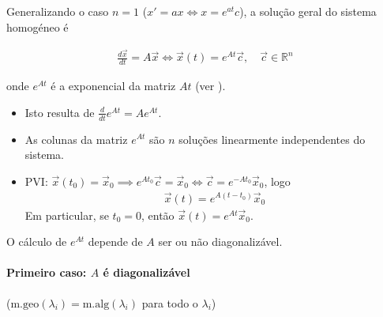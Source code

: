 \documentclass{article}
\begin{document}
Generalizando o caso $n = 1$ ($x' = ax \Leftrightarrow x = e^{at}c$), a solução geral do sistema
homogéneo é

\begin{gather*}
\boxed{\frac{d\vec{x}}{dt} = A\vec{x} \Leftrightarrow \vec{x}(t) = e^{At}\vec{c}, \quad \vec{c} \in \mathbb{R}^n}
\end{gather*}

onde $e^{At}$ é a exponencial da matriz $At$ (ver ).

\begin{itemize}
    \item Isto resulta de $\frac{d}{dt} e^{At} = A e^{At}$.
    \item As colunas da matriz $e^{At}$ são $n$ soluções linearmente independentes do sistema.
    \item PVI: $\vec{x}(t_0) = \vec{x}_0 \implies e^{At_0}\vec{c} = \vec{x}_0 \Leftrightarrow
    \vec{c} = e^{-At_0}\vec{x}_0$, logo
    \begin{gather*}
    \boxed{\vec{x}(t) = e^{A(t - t_0)}\vec{x}_0}
    \end{gather*}
    Em particular, se $t_0 = 0$, então $\vec{x}(t) = e^{At}\vec{x}_0$.
\end{itemize}

O cálculo de $e^{At}$ depende de $A$ ser ou não diagonalizável.

\paragraph{Primeiro caso: $A$ é diagonalizável}
($\text{m.geo}(\lambda_i) = \text{m.alg}(\lambda_i)$ para todo o $\lambda_i$)
\end{document}
